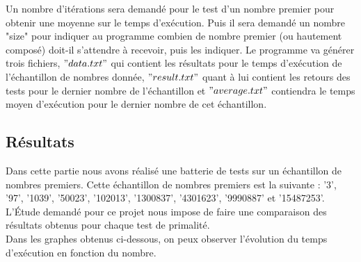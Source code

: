 Un nombre d'itérations sera demandé pour le test d'un nombre premier pour obtenir une moyenne sur le temps d'exécution. Puis il sera demandé un nombre "size" pour indiquer au programme combien de nombre premier (ou hautement composé) doit-il s'attendre à recevoir, puis les indiquer. Le programme va générer trois fichiers, $"data.txt"$ qui contient les résultats pour le temps d'exécution de l'échantillon de nombres donnée, $"result.txt"$ quant à lui contient les retours des tests pour le dernier nombre de l'échantillon et $"average.txt"$ contiendra le temps moyen d'exécution pour le dernier nombre de cet échantillon.
	
		\subsection{Résultats}
	Dans cette partie nous avons réalisé une batterie de tests sur un échantillon de nombres premiers. Cette échantillon de nombres premiers est la suivante : '3', '97', '1039', '50023', '102013', '1300837', '4301623', '9990887' et '15487253'. L’Étude demandé pour ce projet nous impose de faire une comparaison des résultats obtenus pour chaque test de primalité.\\
	Dans les graphes obtenus ci-dessous, on peux observer l'évolution du temps d'exécution en fonction du nombre.	
	
